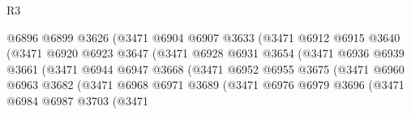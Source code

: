 \begin{lexlean}{R3}
\begin{coremodule}
                                      @6896
                                      @6899
                                      @3626
                                      (@3471
                                        @6904
                                        @6907
                                        @3633
                                        (@3471
                                          @6912
                                          @6915
                                          @3640
                                          (@3471
                                            @6920
                                            @6923
                                            @3647
                                            (@3471
                                              @6928
                                              @6931
                                              @3654
                                              (@3471
                                                @6936
                                                @6939
                                                @3661
                                                (@3471
                                                  @6944
                                                  @6947
                                                  @3668
                                                  (@3471
                                                    @6952
                                                    @6955
                                                    @3675
                                                    (@3471
                                                      @6960
                                                      @6963
                                                      @3682
                                                      (@3471
                                                        @6968
                                                        @6971
                                                        @3689
                                                        (@3471
                                                          @6976
                                                          @6979
                                                          @3696
                                                          (@3471
                                                            @6984
                                                            @6987
                                                            @3703
                                                            (@3471

\end{coremodule}
\end{lexlean}
